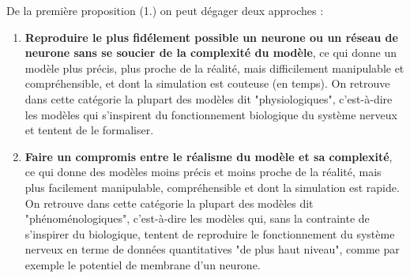 \documentclass[12pt]{scrartcl}
\begin{document}
	De la première proposition (1.) on peut dégager deux approches :  
		\begin{enumerate} \item \textbf{Reproduire le plus fidélement possible un neurone ou un réseau de neurone sans se soucier de la complexité du modèle}, ce qui donne un modèle plus précis, plus proche de la réalité, mais difficilement manipulable et compréhensible, et dont la simulation est couteuse (en temps). On retrouve dans cette catégorie la plupart des modèles dit "physiologiques", c'est-à-dire les modèles qui s'inspirent du fonctionnement biologique du système nerveux et tentent de le formaliser.  
		\item \textbf{Faire un compromis entre le réalisme du modèle et sa complexité}, ce qui donne des modèles moins précis et moins proche de la réalité, mais plus facilement manipulable, compréhensible et dont la simulation est rapide. On retrouve dans cette catégorie la plupart des modèles dit "phénoménologiques", c'est-à-dire les modèles qui, sans la contrainte de s'inspirer du biologique, tentent de reproduire le fonctionnement du système nerveux en terme de données quantitatives "de plus haut niveau", comme par exemple le potentiel de membrane d'un neurone. \end{enumerate}
	
\end{document}
